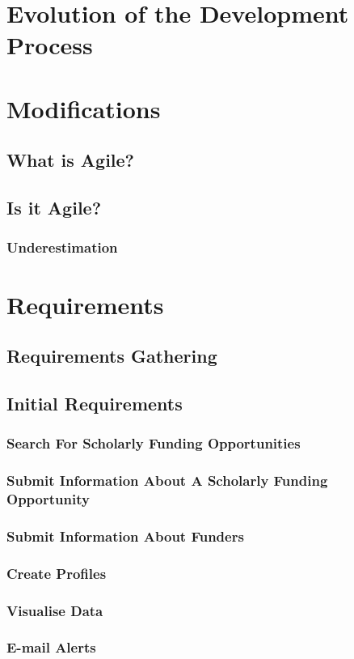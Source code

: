\section{Evolution of the Development Process}
\section{Modifications}
\subsection{What is Agile?}
\subsection{Is it Agile?}
\subsubsection{Underestimation}
\section{Requirements}
\subsection{Requirements Gathering}
\subsection{Initial Requirements}
\subsubsection{Search For Scholarly Funding Opportunities}
\subsubsection{Submit Information About A Scholarly Funding Opportunity}
\subsubsection{Submit Information About Funders}
\subsubsection{Create Profiles}
\subsubsection{Visualise Data}
\subsubsection{E-mail Alerts}
